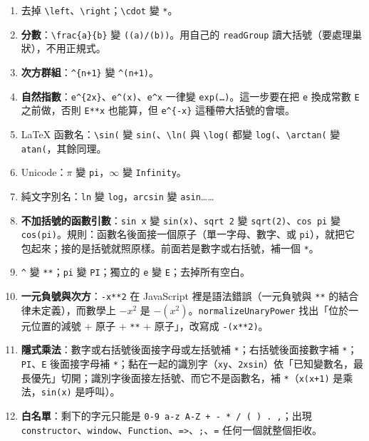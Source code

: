 \documentclass[11pt,a4paper,oneside]{book}
\renewcommand{\_}{\ifmmode\origunderscore\else\textunderscore\allowbreak\fi}
\newcommand{\code}[1]{\texttt{#1}}
\begin{document}
\begin{enumerate}[label=\arabic*.]
  \item 去掉 \code{\textbackslash left}、\code{\textbackslash right}；\code{\textbackslash cdot} 變 \code{*}。
  \item \textbf{分數}：\code{\textbackslash frac\{a\}\{b\}} 變 \code{((a)/(b))}。用自己的 \code{readGroup} 讀大括號（要處理巢狀），不用正規式。
  \item \textbf{次方群組}：\code{\string^\{n+1\}} 變 \code{\string^(n+1)}。
  \item \textbf{自然指數}：\code{e\string^\{2x\}}、\code{e\string^(x)}、\code{e\string^x} 一律變 \code{exp(…)}。這一步要在把 \code{e} 換成常數 \code{E} 之前做，否則 \code{E**x} 也能算，但 \code{e\string^\{-x\}} 這種帶大括號的會壞。
  \item LaTeX 函數名：\code{\textbackslash sin(} 變 \code{sin(}、\code{\textbackslash ln(} 與 \code{\textbackslash log(} 都變 \code{log(}、\code{\textbackslash arctan(} 變 \code{atan(}，其餘同理。
  \item Unicode：$\pi$ 變 \code{pi}，$\infty$ 變 \code{Infinity}。
  \item 純文字別名：\code{ln} 變 \code{log}，\code{arcsin} 變 \code{asin}……
  \item \textbf{不加括號的函數引數}：\code{sin x} 變 \code{sin(x)}、\code{sqrt 2} 變 \code{sqrt(2)}、\code{cos pi} 變 \code{cos(pi)}。規則：函數名後面接一個原子（單一字母、數字、或 \code{pi}），就把它包起來；接的是括號就照原樣。前面若是數字或右括號，補一個 \code{*}。
  \item \code{\string^} 變 \code{**}；\code{pi} 變 \code{PI}；獨立的 \code{e} 變 \code{E}；去掉所有空白。
  \item \textbf{一元負號與次方}：\code{-x**2} 在 JavaScript 裡是語法錯誤（一元負號與 \code{**} 的結合律未定義），而數學上 $-x^2$ 是 $-(x^2)$。\code{normalizeUnaryPower} 找出「位於一元位置的減號 + 原子 + \code{**} + 原子」，改寫成 \code{-(x**2)}。
  \item \textbf{隱式乘法}：數字或右括號後面接字母或左括號補 \code{*}；右括號後面接數字補 \code{*}；\code{PI}、\code{E} 後面接字母補 \code{*}；黏在一起的識別字（\code{xy}、\code{2xsin}）依「已知變數名，最長優先」切開；識別字後面接左括號、而它不是函數名，補 \code{*}（\code{x(x+1)} 是乘法，\code{sin(x)} 是呼叫）。
  \item \textbf{白名單}：剩下的字元只能是 \code{0-9 a-z A-Z \_ + - * / ( ) . ,}；出現 \code{constructor}、\code{window}、\code{Function}、\code{=>}、\code{;}、\code{=} 任何一個就整個拒收。
\end{enumerate}
\end{document}
